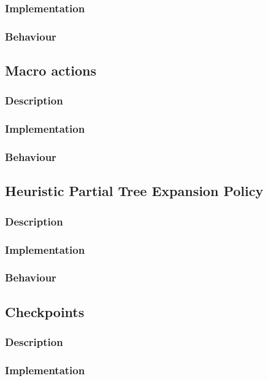 \documentclass[10pt,a4paper]{article}
\begin{document}
\subsubsection{Implementation}

\subsubsection{Behaviour}

\subsection{Macro actions}
\label{macro}
\cite{salesman}
\subsubsection{Description}
\subsubsection{Implementation}
\subsubsection{Behaviour}
\subsection{Heuristic Partial Tree Expansion Policy}
\subsubsection{Description}
\subsubsection{Implementation}
\subsubsection{Behaviour}
\subsection{Checkpoints}
\subsubsection{Description}
\subsubsection{Implementation}
\end{document}
